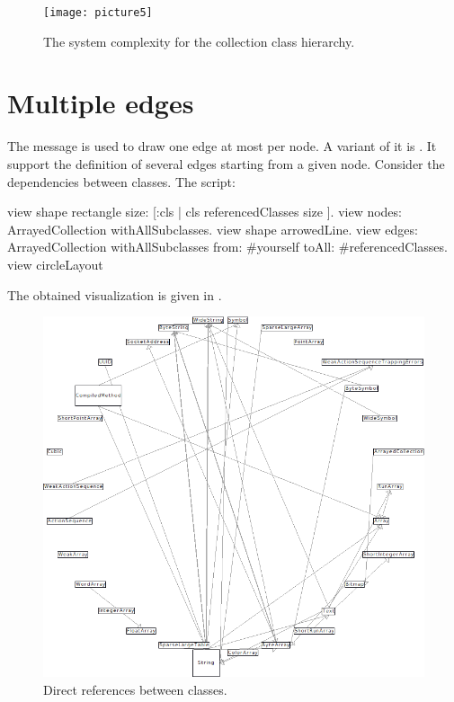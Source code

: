 \documentclass[a4paper,10pt,twoside]{book}
\begin{document}
\begin{figure}[htbp]
\centerline{\texttt{[image: picture5]}}
\caption{The system complexity for the collection class hierarchy.}
\label{fig:picture5}
\end{figure}


\section{Multiple edges}

The message  is used to draw one edge at most per node. A variant of it is . It support the definition of several edges starting from a given node. Consider the dependencies between classes. The script: 

\begin{code}{}
view shape rectangle size: [:cls | cls referencedClasses size ].
view nodes: ArrayedCollection withAllSubclasses.
view shape arrowedLine.
view 
	edges: ArrayedCollection withAllSubclasses from: #yourself toAll: #referencedClasses.
view circleLayout
\end{code}

The obtained visualization is given in .

\begin{figure}[htbp]
\centerline{\includegraphics[width=\linewidth]{classDependencies}}
\caption{Direct references between classes.}
\label{fig:classDependencies}
\end{figure}
\end{document}
